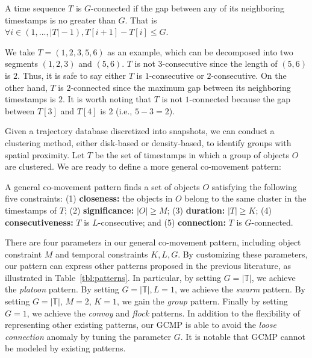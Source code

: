 \begin{definition}[$G$-connected]
A time sequence $T$ is $G$-connected if the gap between any of its neighboring timestamps is no greater than $G$. That is
 $\forall i \in (1,...,|T|-1), T[i+1]-T[i] \leq G$.
\end{definition}

We take $T=(1,2,3,5,6)$ as an example, which can be decomposed into two segments $(1,2,3)$ and $(5,6)$. $T$ is not $3$-consecutive since the length of $(5,6)$ is $2$. Thus, it is safe to say either $T$ is $1$-consecutive or $2$-consecutive. On the other hand, $T$ is $2$-connected since the maximum gap between its neighboring timestamps is $2$. It is worth noting that $T$ is not $1$-connected because the gap between $T[3]$ and $T[4]$ is $2$ (i.e., $5-3=2$).

Given a trajectory database discretized into snapshots, we can conduct a clustering method, either disk-based or density-based, to identify groups with spatial proximity. Let $T$ be the set of timestamps in which a group of objects $O$ are clustered. We are ready to define a more general co-movement pattern:
\begin{definition}
A general co-movement pattern finds a set of objects $O$ satisfying the following five constraints: (1) \textbf{closeness:} the objects in $O$ belong to the same cluster in the timestamps of $T$; (2) \textbf{significance:} $|O| \geq M$; (3) \textbf{duration:} $|T| \geq K$; (4) \textbf{consecutiveness:} $T$ is $L$-consecutive; and (5) \textbf{connection:} $T$ is $G$-connected.
\end{definition}
There are four parameters in our general co-movement pattern, including object constraint $M$ and temporal constraints $K,L,G$.  By customizing these parameters, our pattern can 
express other patterns proposed in the previous literature, as illustrated in Table~\ref{tbl:patterns}. 
In particular, by setting $G=|\mathbb{T}|$, we achieve the \emph{platoon} pattern. By setting $G=|\mathbb{T}|,L=1$, we achieve the \emph{swarm} pattern. By setting $G=|\mathbb{T}|$, $M=2$, $K=1$, we gain the \emph{group} pattern. Finally by setting $G=1$, we achieve the \emph{convoy} and \emph{flock} patterns. 
In addition to the flexibility of representing other existing patterns, our GCMP is able to avoid the \emph{loose connection} anomaly by tuning the parameter $G$. 
It is notable that GCMP cannot be modeled by existing patterns. 
